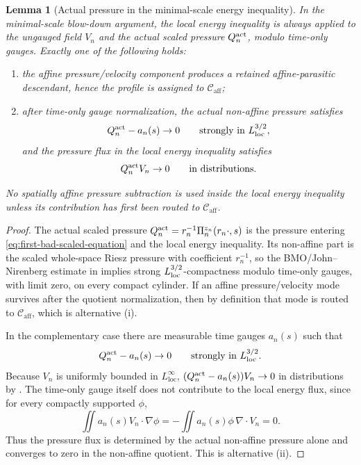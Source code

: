 \documentclass[11pt]{amsart}
\numberwithin{equation}{section}
\theoremstyle{plain}
\newtheorem{lemma}[lemma]{Lemma}
\theoremstyle{definition}
\theoremstyle{remark}
\newcommand{\loc}{\mathrm{loc}}
\newcommand{\Caff}{\mathcal C_{\mathrm{aff}}}
\begin{document}
\begin{lemma}[Actual pressure in the minimal-scale energy inequality]
\label{lem:actual-pressure-minimal-scale-energy}
In the minimal-scale blow-down argument, the local energy inequality is always
applied to the ungauged field \(V_n\) and the actual scaled pressure
\(Q_n^{\rm act}\), modulo time-only gauges.  Exactly one of the following
holds:
\begin{enumerate}[label=\textup{(\roman*)}]
\item the affine pressure/velocity component produces a retained
affine-parasitic descendant, hence the profile is assigned to \(\Caff\);
\item after time-only gauge normalization, the actual non-affine pressure
satisfies
\[
   Q_n^{\rm act}-a_n(s)\to0
   \qquad\text{strongly in }L^{3/2}_{\rm loc},
\]
and the pressure flux in the local energy inequality satisfies
\[
   Q_n^{\rm act}V_n \to 0
   \qquad\text{in distributions}.
\]
\end{enumerate}
No spatially affine pressure subtraction is used inside the local energy
inequality unless its contribution has first been routed to \(\Caff\).
\end{lemma}

\begin{proof}
The actual scaled pressure \(Q_n^{\rm act}=r_n^{-1}\Pi_n^{z_n}(r_n\cdot,s)\)
is the pressure entering \eqref{eq:first-bad-scaled-equation} and the local
energy inequality.  Its non-affine part is the scaled whole-space Riesz
pressure with coefficient \(r_n^{-1}\), so the BMO/John--Nirenberg estimate in
 implies strong
\(L^{3/2}_{\rm loc}\)-compactness modulo time-only gauges, with limit zero, on
every compact cylinder.  If an affine pressure/velocity mode survives after the
quotient normalization, then by definition that mode is routed to \(\Caff\),
which is alternative \textup{(i)}.

In the complementary case there are measurable time gauges \(a_n(s)\) such
that
\[
   Q_n^{\rm act}-a_n(s)\to0
   \qquad\hbox{strongly in }L^{3/2}_{\rm loc}.
\]
Because \(V_n\) is uniformly bounded in \(L^\infty_{\loc}\),
\((Q_n^{\rm act}-a_n(s))V_n\to0\) in distributions by
.  The time-only gauge itself
does not contribute to the local energy flux, since for every compactly
supported \(\phi\),
\[
   \iint a_n(s)V_n\cdot\nabla\phi
   =-\iint a_n(s)\phi\,\nabla\cdot V_n=0.
\]
Thus the pressure flux is determined by the actual non-affine pressure alone and
converges to zero in the non-affine quotient.  This is alternative
\textup{(ii)}.
\end{proof}
\end{document}

